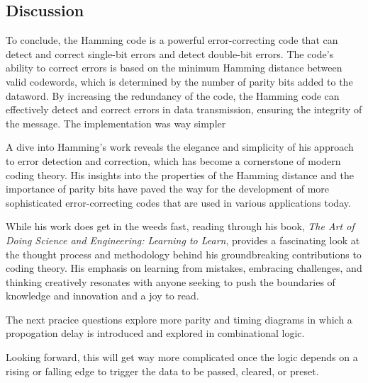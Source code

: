 \documentclass[12pt]{article}
\begin{document}
\subsection*{Discussion}
To conclude, the Hamming code is a powerful error-correcting code that can detect and correct single-bit errors and detect double-bit errors. The code’s ability to correct errors is based on the minimum Hamming distance between valid codewords, which is determined by the number of parity bits added to the dataword. By increasing the redundancy of the code, the Hamming code can effectively detect and correct errors in data transmission, ensuring the integrity of the message. The implementation was way simpler

A dive into Hamming's work reveals the elegance and simplicity of his approach to error detection and correction, which has become a cornerstone of modern coding theory. His insights into the properties of the Hamming distance and the importance of parity bits have paved the way for the development of more sophisticated error-correcting codes that are used in various applications today.

While his work does get in the weeds fast, reading through his book, \textit{The
	Art of Doing Science and Engineering: Learning to Learn}, provides a fascinating
look at the thought process and methodology behind his groundbreaking
contributions to coding theory. His emphasis on learning from mistakes,
embracing challenges, and thinking creatively resonates with anyone seeking to
push the boundaries of knowledge and innovation and a joy to read.

The next pracice questions explore more parity and timing diagrams in which a
propogation delay is introduced and explored in combinational logic.

Looking forward, this will get way more complicated once the logic depends on a
rising or falling edge to trigger the data to be passed, cleared, or preset.
\end{document}
